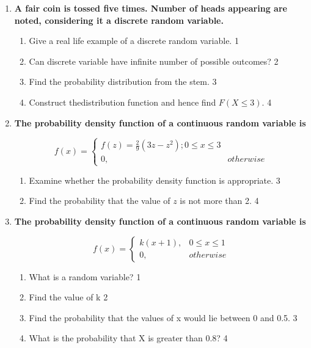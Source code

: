 \documentclass[a4paper,oneside, margin=1.4in]{book}
\begin{document}
\begin{enumerate}
  
   \item
	  \textbf{A fair coin is tossed five times. Number of heads appearing are noted, considering it a discrete random variable.} 
  
  \begin{enumerate}
    \item
	Give a real life example of a discrete random variable. \hfill 1
    \item
	Can discrete variable have infinite number of possible outcomes? \hfill 2
    \item  
	Find the probability distribution from the stem. \hfill 3
    \item
	Construct thedistribution function and hence find $F(X \le 3)$. \hfill 4
  \end{enumerate}
  
 \item
  \textbf{The probability density function of a continuous random variable is}

$$
  f(x) =
\begin{cases}
f(z) = \frac29 (3z-z^2); 0 \le x \le 3 \\
0, & otherwise
\end{cases}
$$
  
  \begin{enumerate}
    \item  
	Examine whether the probability density function is appropriate. \hfill 3
    \item
	Find the probability that the value of $z$ is not more than 2. \hfill 4
  \end{enumerate}
  
  \item
  \textbf{The probability density function of a continuous random variable is}

$$
  f(x) =
\begin{cases}
k(x+1),  & 0 \le x \le 1 \\
0, & otherwise
\end{cases}
$$

  \begin{enumerate}
    \item
	What is a random variable? \hfill 1
    \item
    	Find the value of k \hfill 2
    \item
    	Find the probability that the values of x would lie between 0 and 0.5. \hfill 3
     \item
     	What is the probability that X is greater than 0.8?  \hfill 4
  \end{enumerate}
  

\end{enumerate}
\end{document}
